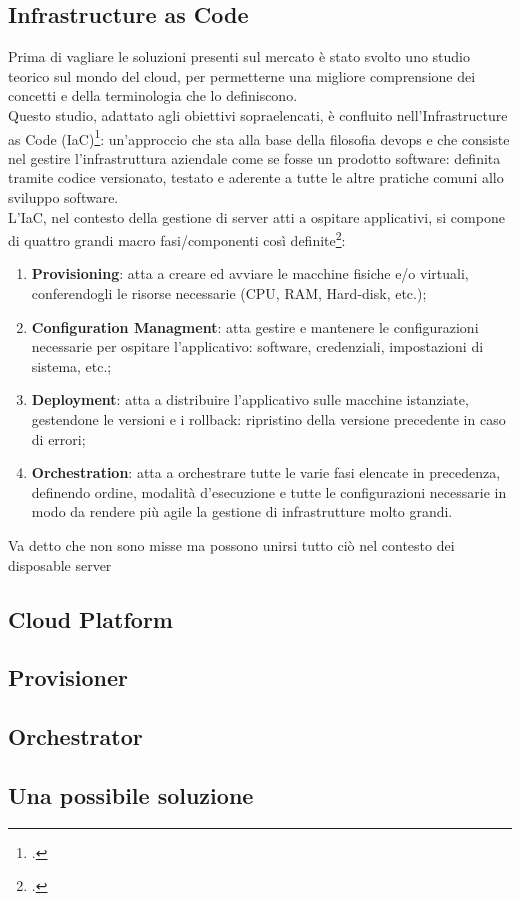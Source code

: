 \subsection{Infrastructure as Code}
Prima di vagliare le soluzioni presenti sul mercato è stato svolto uno studio teorico sul mondo del \gls{cloud}, per permetterne una migliore comprensione dei concetti e della terminologia che lo definiscono. \\
Questo studio, adattato agli obiettivi sopraelencati, è confluito nell'Infrastructure as Code (IaC)\footcite{article:iac}: un'approccio che sta alla base della filosofia \gls{devops} e che consiste nel gestire l'infrastruttura aziendale come se fosse un prodotto software: definita tramite codice versionato, testato e aderente a tutte le altre pratiche comuni allo sviluppo software. \\
L'IaC, nel contesto della gestione di server atti a ospitare applicativi, si compone di quattro grandi macro fasi/componenti così definite\footcite{article:iac-components}:
\begin{enumerate}
	\item \textbf{Provisioning}: atta a creare ed avviare le macchine fisiche e/o virtuali, conferendogli le risorse necessarie (CPU, RAM, Hard-disk, etc.);
	\item \textbf{Configuration Managment}: atta gestire e mantenere le configurazioni necessarie per ospitare l'applicativo: software, credenziali, impostazioni di sistema, etc.;
	\item \textbf{Deployment}: atta a distribuire l'applicativo sulle macchine istanziate, gestendone le versioni e i rollback: ripristino della versione precedente in caso di errori;
	\item \textbf{Orchestration}: atta a orchestrare tutte le varie fasi elencate in precedenza, definendo ordine, modalità d'esecuzione e tutte le configurazioni necessarie in modo da rendere più agile la gestione di infrastrutture molto grandi.
\end{enumerate}
Va detto che non sono misse ma possono unirsi
tutto ciò nel contesto dei disposable server
\subsection{Cloud Platform}
\subsection{Provisioner}
\subsection{Orchestrator}
\subsection{Una possibile soluzione}